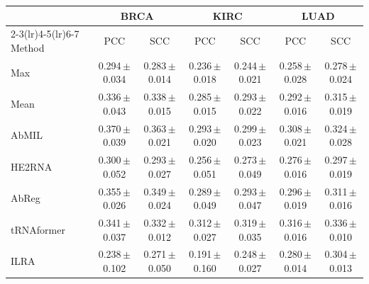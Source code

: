 \begin{tabular}{lcccccc}
\toprule
& \multicolumn{2}{c}{BRCA} & \multicolumn{2}{c}{KIRC} & \multicolumn{2}{c}{LUAD}\\
\cmidrule(lr){2-3}\cmidrule(lr){4-5}\cmidrule(lr){6-7}
Method & PCC & SCC & PCC & SCC & PCC & SCC\\
\midrule
Max~\citep{wang2018revisiting} & 0.294\,{\tiny$\pm$}0.034 & 0.283\,{\tiny$\pm$}0.014 & 0.236\,{\tiny$\pm$}0.018 & 0.244\,{\tiny$\pm$}0.021 & 0.258\,{\tiny$\pm$}0.028 & 0.278\,{\tiny$\pm$}0.024\\
Mean~\citep{wang2018revisiting} & 0.336\,{\tiny$\pm$}0.043 & 0.338\,{\tiny$\pm$}0.015 & 0.285\,{\tiny$\pm$}0.015 & 0.293\,{\tiny$\pm$}0.022 & 0.292\,{\tiny$\pm$}0.016 & 0.315\,{\tiny$\pm$}0.019\\
AbMIL~\citep{ilse2018abmil} & 0.370\,{\tiny$\pm$}0.039 & 0.363\,{\tiny$\pm$}0.021 & 0.293\,{\tiny$\pm$}0.020 & 0.299\,{\tiny$\pm$}0.023 & 0.308\,{\tiny$\pm$}0.021 & 0.324\,{\tiny$\pm$}0.028\\
HE2RNA~\citep{schmauch2020he2rna} & 0.300\,{\tiny$\pm$}0.052 & 0.293\,{\tiny$\pm$}0.027 & 0.256\,{\tiny$\pm$}0.051 & 0.273\,{\tiny$\pm$}0.049 & 0.276\,{\tiny$\pm$}0.016 & 0.297\,{\tiny$\pm$}0.019\\
AbReg~\citep{graziani2022abreg} & 0.355\,{\tiny$\pm$}0.026 & 0.349\,{\tiny$\pm$}0.024 & 0.289\,{\tiny$\pm$}0.049 & 0.293\,{\tiny$\pm$}0.047 & 0.296\,{\tiny$\pm$}0.019 & 0.311\,{\tiny$\pm$}0.016\\
tRNAformer~\citep{alsaafin2022trnaformer} & 0.341\,{\tiny$\pm$}0.037 & 0.332\,{\tiny$\pm$}0.012 & 0.312\,{\tiny$\pm$}0.027 & 0.319\,{\tiny$\pm$}0.035 & 0.316\,{\tiny$\pm$}0.016 & 0.336\,{\tiny$\pm$}0.010\\
ILRA~\citep{xiang2023ilra} & 0.238\,{\tiny$\pm$}0.102 & 0.271\,{\tiny$\pm$}0.050 & 0.191\,{\tiny$\pm$}0.160 & 0.248\,{\tiny$\pm$}0.027 & 0.280\,{\tiny$\pm$}0.014 & 0.304\,{\tiny$\pm$}0.013\\

\end{tabular}
